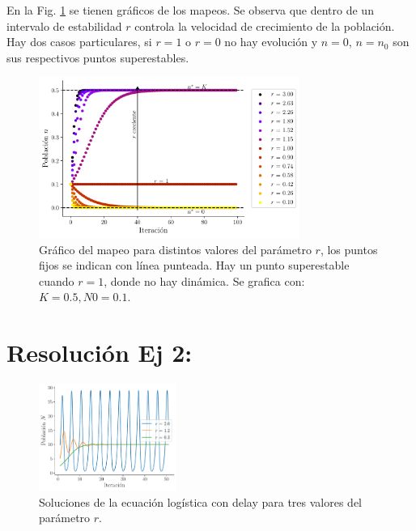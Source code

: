 \documentclass[twocolumn,aps,prl]{revtex4-1}
\begin{document}
En la Fig. \ref{fig:scripts/ex1} se tienen gráficos de los mapeos. Se observa que dentro de un intervalo de estabilidad $r$ controla la velocidad de crecimiento de la población. Hay dos casos particulares, si $r=1$ o $r=0$ no hay evolución y $n=0$, $n=n_0$ son sus respectivos puntos superestables. 

\begin{figure}[ht!]  
    \centering
        \centering 
        \includegraphics[width = 0.76\textwidth]{scripts/ex1.pdf}
        \caption{Gráfico del mapeo para distintos valores del parámetro $r$, los puntos fijos se indican con línea punteada. Hay un punto superestable cuando $r=1$, donde no hay dinámica. Se grafica con: $K = 0.5,N0 = 0.1$.}
        \label{fig:scripts/ex1}
\end{figure}

% 

\section{Resolución Ej 2:}

\begin{figure}[ht!]
    \centering
        \centering
        \includegraphics[width = 0.4\textwidth]{scripts/ex2-cosa.pdf}
        \caption{Soluciones de la ecuación logística con delay para tres valores del parámetro $r$.}
        \label{fig:scripts/ex2-cosa}
\end{figure}
\end{document}

